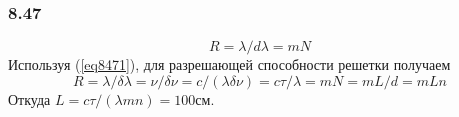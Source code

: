 \subsubsection*{8.47}
\begin{equation}\label{eq8471}
	R = \lambda / d \lambda = mN
\end{equation}
Используя (\ref{eq8471}), для разрешающей способности решетки получаем
\begin{equation*}
	R = \lambda / \delta \lambda = \nu / \delta \nu =  c / (\lambda \delta \nu) = c \tau / \lambda = mN = m L / d = m L n
\end{equation*}
Откуда $L = c \tau / (\lambda m n) = 100см$.